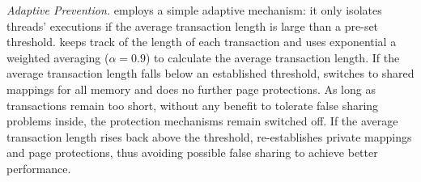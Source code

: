 \emph{Adaptive Prevention.}
\SheriffProtect{} employs a simple adaptive mechanism: it only isolates threads' executions if the average transaction length is large than a pre-set threshold. \SheriffProtect{} keeps track of the length of each transaction and uses exponential a weighted averaging ($\alpha = 0.9$) to calculate the average transaction length. If the average transaction length falls below an established threshold, \SheriffProtect{} switches to shared mappings for all memory and does no further page protections. As long as transactions remain too short, 
 without any benefit to tolerate false sharing problems inside, the protection mechanisms remain switched off. If the average transaction length rises back above the threshold, \SheriffProtect{} re-establishes private mappings and page protections, thus avoiding possible false sharing to achieve better performance.